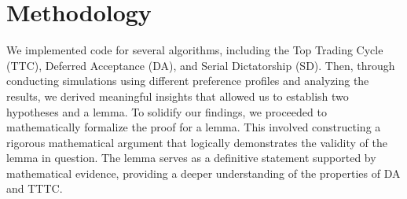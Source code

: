 \documentclass[a4paper,11pt,table]{article}
\theoremstyle{definition}
\theoremstyle{remark}
\begin{document}




     
     
  
     \pagebreak
    \section{Methodology}

  We implemented code for several algorithms, including the Top Trading Cycle (TTC), Deferred Acceptance (DA), and Serial Dictatorship (SD). Then, through conducting simulations using different preference profiles and analyzing the results, we derived meaningful insights that allowed us to establish two hypotheses and a lemma. To solidify our findings, we proceeded to mathematically formalize the proof for a lemma. This involved constructing a rigorous mathematical argument that logically demonstrates the validity of the lemma in question. The lemma serves as a definitive statement supported by mathematical evidence, providing a deeper understanding of the properties of DA and TTTC.
\\
\end{document}
